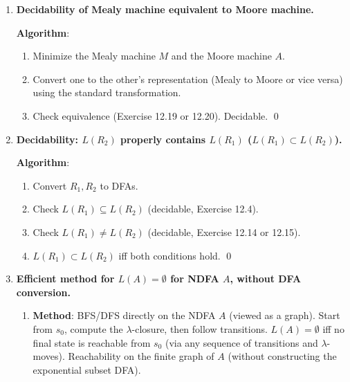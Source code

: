 \begin{enumerate}[{12.}1. ]
\textbf{Algorithm} (structural induction on $R_1$):
- $R_1 = \pmb{\emptyset}$: finite (empty). No.
- $R_1 = \lambda$ or $R_1 = a$: finite. No.
- $R_1 = R \cup R'$: infinite iff $R$ or $R'$ is infinite.
- $R_1 = R\cdot R'$: infinite iff (R is infinite and $L(R')$ is nonempty) or ($L(R)$ is nonempty and $R'$ is infinite).
- $R_1 = R^*$: infinite iff $L(R)$ contains a nonempty string.

Each check is computable by structural recursion on $R_1$. Terminates since $R_1$ is finite. \qed

\item \textbf{Decidability of Mealy machine equivalent to Moore machine.}

\textbf{Algorithm}:
\begin{enumerate}
\item Minimize the Mealy machine $M$ and the Moore machine $A$.
\item Convert one to the other's representation (Mealy to Moore or vice versa) using the standard transformation.
\item Check equivalence (Exercise 12.19 or 12.20). Decidable. \qed
\end{enumerate}

\item \textbf{Decidability: $L(R_2)$ properly contains $L(R_1)$ ($L(R_1)\subset L(R_2)$).}

\textbf{Algorithm}:
\begin{enumerate}
\item Convert $R_1, R_2$ to DFAs.
\item Check $L(R_1)\subseteq L(R_2)$ (decidable, Exercise 12.4).
\item Check $L(R_1)\neq L(R_2)$ (decidable, Exercise 12.14 or 12.15).
\item $L(R_1)\subset L(R_2)$ iff both conditions hold. \qed
\end{enumerate}

\item \textbf{Efficient method for $L(A)=\emptyset$ for NDFA $A$, without DFA conversion.}

\begin{enumerate}
\item \textbf{Method}: BFS/DFS directly on the NDFA $A$ (viewed as a graph). Start from $s_0$, compute the $\lambda$-closure, then follow transitions. $L(A)=\emptyset$ iff no final state is reachable from $s_0$ (via any sequence of transitions and $\lambda$-moves). Reachability on the finite graph of $A$ (without constructing the exponential subset DFA).


\end{enumerate}
\end{enumerate}
